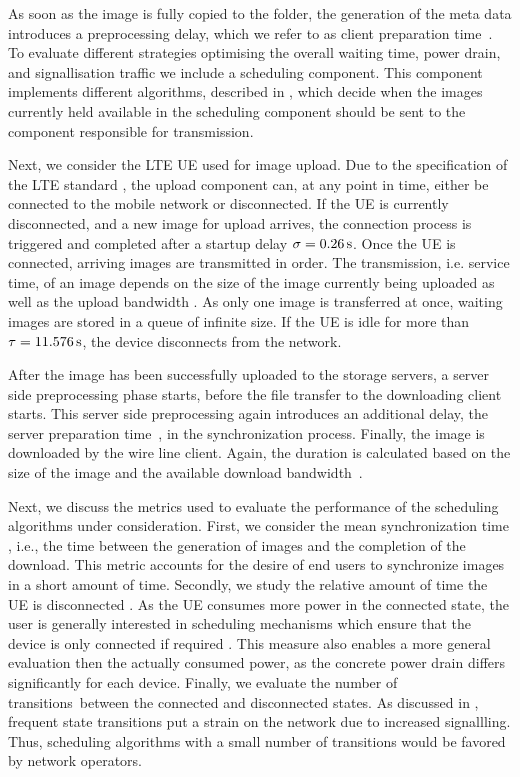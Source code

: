 As soon as the image is fully copied to the \dropbox folder, the generation of the meta data introduces a preprocessing delay, which we refer to as client preparation time~\clientpreparationtime.
To evaluate different strategies optimising the overall waiting time, power drain, and signallisation traffic we include a scheduling component.
This component implements different algorithms, described in , which decide when the images currently held available in the scheduling component should be sent to the component responsible for transmission.

Next, we consider the \gls{LTE} \gls{UE} used for image upload.
Due to the specification of the \gls{LTE} standard \cite{3GPP_RRC_Spec}, the upload component can, at any point in time, either be connected to the mobile network or disconnected.
If the \gls{UE} is currently disconnected, and a new image for upload arrives, the connection process is triggered and completed after a startup delay \(\sigma = \SI{0.26}{\second}\).
Once the \gls{UE} is connected, arriving images are transmitted in order.
The transmission, i.e. service time, of an image depends on the size of the image currently being uploaded as well as the upload bandwidth \uploadbandwidth.
As only one image is transferred at once, waiting images are stored in a queue of infinite size.
If the \gls{UE} is idle for more than \(\tau = \SI{11.576}{\second}\), the device disconnects from the network.

After the image has been successfully uploaded to the storage servers, a server side preprocessing phase starts, before the file transfer to the downloading client starts.
This server side preprocessing again introduces an additional delay, the server preparation time~\serverpreparationtime, in the synchronization process.
Finally, the image is downloaded by the wire line client.
Again, the duration is calculated based on the size of the image and the available download bandwidth~\downloadbandwidth.

Next, we discuss the metrics used to evaluate the performance of the scheduling algorithms under consideration.
First, we consider the mean synchronization time \sojournTime, i.e., the time between the generation of images and the completion of the download.
This metric accounts for the desire of end users to synchronize images in a short amount of time.
Secondly, we study the relative amount of time the \gls{UE} is disconnected \relativeDisconnectedTime.
As the \gls{UE} consumes more power in the connected state, the user is generally interested in scheduling mechanisms which ensure that the device is only connected if required \cite{Ickin2012}.
This measure also enables a more general evaluation then the actually consumed power, as the concrete power drain differs significantly for each device.
Finally, we evaluate the number of transitions~\connectionCount between the connected and disconnected states.
As discussed in , frequent state transitions put a strain on the network due to increased signallling.
Thus, scheduling algorithms with a small number of transitions would be favored by network operators.

